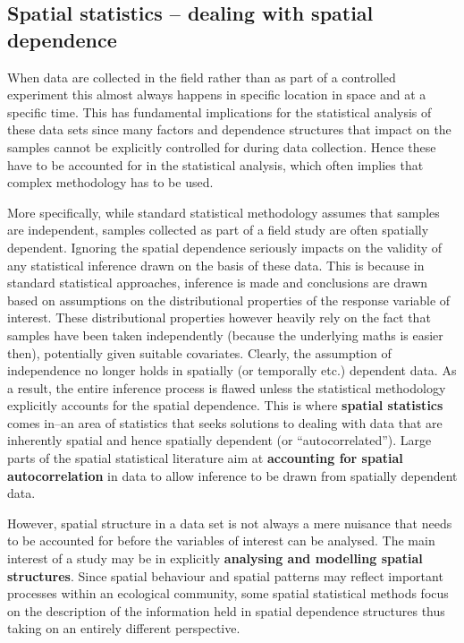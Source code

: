 \subsection{Spatial statistics -- dealing with spatial dependence}
When data are collected in the field rather than as part of a controlled experiment this almost always happens in specific location in space and at a specific time. This has fundamental implications for the statistical analysis of these data sets since many factors and dependence structures that impact on the samples cannot be explicitly controlled for during data collection. Hence these have to be accounted for in the statistical analysis, which often implies that complex methodology has to be used.

More specifically, while standard statistical methodology assumes that samples are independent, samples collected as part of a field study are often spatially dependent. Ignoring the spatial dependence seriously impacts on the validity of any statistical inference drawn on the basis of  these data. This is because in standard statistical approaches, inference is made and conclusions are drawn based on assumptions on the distributional properties of the response variable of interest. These distributional properties however heavily rely on the fact that samples have been taken independently (because the underlying maths is easier then), potentially given suitable covariates. Clearly, the assumption of independence no longer holds in spatially (or temporally etc.) dependent data. As a result, the entire inference process is flawed unless the statistical methodology explicitly accounts for the spatial dependence.  This is where \textbf{spatial statistics} comes in--an area of statistics that seeks solutions to dealing with data that are inherently spatial and hence spatially dependent (or ``autocorrelated'').  Large parts of the spatial statistical literature aim at \textbf{accounting for spatial autocorrelation} in data to allow inference to be drawn from spatially dependent data.

However, spatial structure in a data set is not always a mere nuisance that needs to be accounted for before the variables of interest can be analysed. The main interest of a study may be in explicitly \textbf{analysing and modelling spatial structures}. Since spatial behaviour and spatial patterns may reflect important processes within an ecological community, some spatial statistical methods focus on the description of the information held in spatial dependence structures thus taking on an entirely different perspective.

